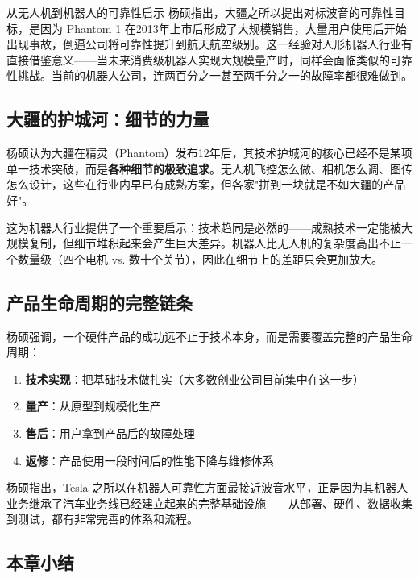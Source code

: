 \documentclass[a4paper]{article}
\begin{document}
\begin{importantbox}{从无人机到机器人的可靠性启示}
杨硕指出，大疆之所以提出对标波音的可靠性目标，是因为 Phantom 1 在2013年上市后形成了大规模销售，大量用户使用后开始出现事故，倒逼公司将可靠性提升到航天航空级别。这一经验对人形机器人行业有直接借鉴意义——当未来消费级机器人实现大规模量产时，同样会面临类似的可靠性挑战。当前的机器人公司，连两百分之一甚至两千分之一的故障率都很难做到。
\end{importantbox}

\subsection{大疆的护城河：细节的力量}

杨硕认为大疆在精灵（Phantom）发布12年后，其技术护城河的核心已经不是某项单一技术突破，而是\textbf{各种细节的极致追求}。无人机飞控怎么做、相机怎么调、图传怎么设计，这些在行业内早已有成熟方案，但各家"拼到一块就是不如大疆的产品好"。

这为机器人行业提供了一个重要启示：技术趋同是必然的——成熟技术一定能被大规模复制，但细节堆积起来会产生巨大差异。机器人比无人机的复杂度高出不止一个数量级（四个电机 vs. 数十个关节），因此在细节上的差距只会更加放大。

\subsection{产品生命周期的完整链条}

杨硕强调，一个硬件产品的成功远不止于技术本身，而是需要覆盖完整的产品生命周期：

\begin{enumerate}
    \item \textbf{技术实现}：把基础技术做扎实（大多数创业公司目前集中在这一步）
    \item \textbf{量产}：从原型到规模化生产
    \item \textbf{售后}：用户拿到产品后的故障处理
    \item \textbf{返修}：产品使用一段时间后的性能下降与维修体系
\end{enumerate}

杨硕指出，Tesla 之所以在机器人可靠性方面最接近波音水平，正是因为其机器人业务继承了汽车业务线已经建立起来的完整基础设施——从部署、硬件、数据收集到测试，都有非常完善的体系和流程。

\subsection{本章小结}
\end{document}

